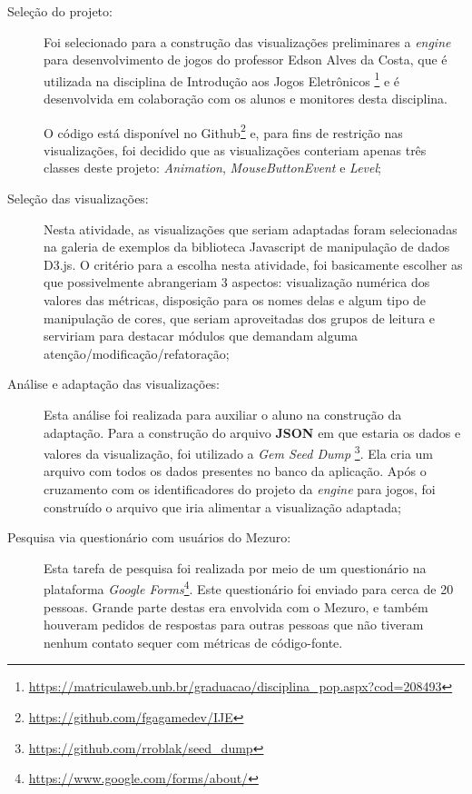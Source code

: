 \begin{description}
  \item [Seleção do projeto:]
    Foi selecionado para a construção das visualizações preliminares a
    \textit{engine} para desenvolvimento de jogos do professor Edson Alves da
    Costa, que é utilizada na disciplina de Introdução aos Jogos Eletrônicos
    \footnote{\url{https://matriculaweb.unb.br/graduacao/disciplina_pop.aspx?cod=208493}}
     e é desenvolvida em colaboração com os alunos e monitores desta disciplina.

     O código está disponível no Github\footnote{\url{https://github.com/fgagamedev/IJE}}
     e, para fins de restrição nas visualizações, foi decidido que as
     visualizações conteriam apenas três classes deste projeto: \textit{Animation},
     \textit{MouseButtonEvent} e \textit{Level};

  \item [Seleção das visualizações:]
    Nesta atividade, as visualizações que seriam adaptadas foram selecionadas na
    galeria de exemplos da biblioteca Javascript de manipulação de dados D3.js.
    O critério para a escolha nesta atividade, foi basicamente escolher as que
    possivelmente abrangeriam 3 aspectos: visualização numérica dos valores das
    métricas, disposição para os nomes delas e algum tipo de manipulação de
    cores, que seriam aproveitadas dos grupos de leitura e serviriam para
    destacar módulos que demandam alguma atenção/modificação/refatoração;

  \item [Análise e adaptação das visualizações:]
    Esta análise foi realizada para auxiliar o aluno na construção da adaptação.
    Para a construção do arquivo \textbf{JSON} em que estaria os dados e valores
    da visualização, foi utilizado a \textit{Gem Seed Dump}
    \footnote{\url{https://github.com/rroblak/seed_dump}}. Ela cria um arquivo
    com todos os dados presentes no banco da aplicação. Após o cruzamento com
    os identificadores do projeto da \textit{engine} para jogos, foi construído
    o arquivo que iria alimentar a visualização adaptada;

  \item [Pesquisa via questionário com usuários do Mezuro:]
    Esta tarefa de pesquisa foi realizada por meio de um questionário na
    plataforma \textit{Google Forms}\footnote{\url{https://www.google.com/forms/about/}}.
    Este questionário foi enviado para cerca de 20 pessoas. Grande parte destas
    era envolvida com o Mezuro, e também houveram pedidos de respostas para
    outras pessoas que não tiveram nenhum contato sequer com métricas de
    código-fonte.


\end{description}
